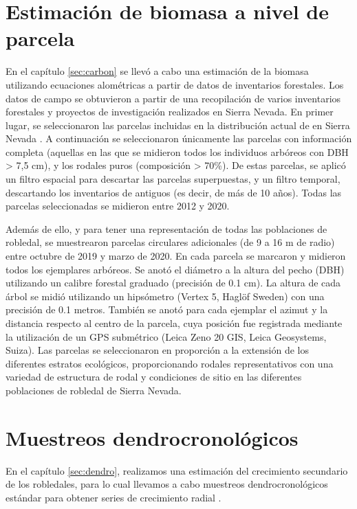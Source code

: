 \section{Estimación de biomasa a nivel de parcela}\label{sec:metodologia:biomasa}

En el capítulo \ref{sec:carbon} se llevó a cabo una estimación de la biomasa utilizando ecuaciones alométricas \autocite[ver][]{Monteroetal2005ProduccionBiomasa} a partir de datos de inventarios forestales. Los datos de campo se obtuvieron a partir de una recopilación de varios inventarios forestales y proyectos de investigación realizados en Sierra Nevada. En primer lugar, se seleccionaron las parcelas incluidas en la distribución actual de \Qp en Sierra Nevada \autocite{PerezLuqueetal2019MapEcosystems}. A continuación se seleccionaron únicamente las parcelas con información completa (aquellas en las que se midieron todos los individuos arbóreos con DBH \textgreater{} 7,5 cm), y los rodales puros (composición \textgreater{} 70\%). De estas parcelas, se aplicó un filtro espacial para descartar las parcelas superpuestas, y un filtro temporal, descartando los inventarios de antiguos (es decir, de más de 10 años). Todas las parcelas seleccionadas se midieron entre 2012 y 2020. 

Además de ello, y para tener una representación de todas las poblaciones de robledal, se muestrearon parcelas circulares adicionales (de 9 a 16 m de radio) entre octubre de 2019 y marzo de 2020. En cada parcela se marcaron y midieron todos los ejemplares arbóreos. Se anotó el diámetro a la altura del pecho (DBH) utilizando un calibre forestal graduado (precisión de 0.1 cm). La altura de cada árbol se midió utilizando un hipsómetro (Vertex 5, Haglöf Sweden) con una precisión de 0.1 metros. También se anotó para cada ejemplar el azimut y la distancia respecto al centro de la parcela, cuya posición fue registrada mediante la utilización de un GPS submétrico (Leica Zeno 20 GIS, Leica Geosystems, Suiza). Las parcelas se seleccionaron en proporción a la extensión de los diferentes estratos ecológicos, proporcionando rodales representativos con una variedad de estructura de rodal y condiciones de sitio en las diferentes poblaciones de robledal de Sierra Nevada. 

\section{Muestreos dendrocronológicos}
\label{sec:metodologia:dendro}

En el capítulo \ref{sec:dendro}, realizamos una estimación del crecimiento secundario de los robledales, para lo cual llevamos a cabo muestreos dendrocronológicos estándar para obtener series de crecimiento radial \autocite{Fritts1976TreeRings,CookKairukstis1990MethodsDendrochronology,Gutierrez2008DendrocronologiaMetodos,Natalinietal2017TecnicasHerramientas}.

